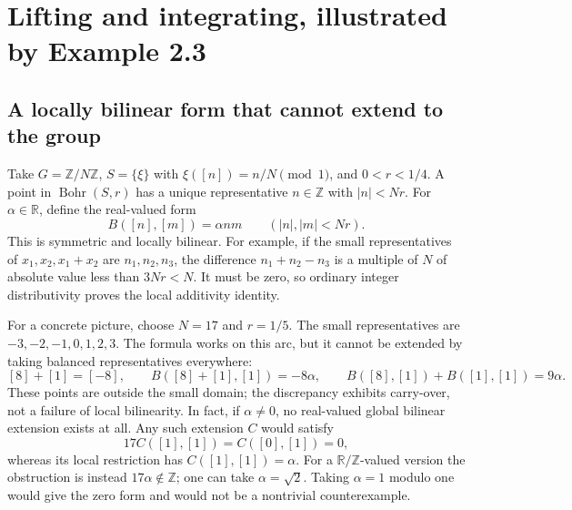\documentclass[11pt,a4paper]{article}
\newcommand{\T}{\mathbb R/\mathbb Z}
\newcommand{\Z}{\mathbb Z}
\newcommand{\R}{\mathbb R}
\newcommand{\Bohr}{\operatorname{Bohr}}
\theoremstyle{definition}
\numberwithin{equation}{section}
\begin{document}
\section{Lifting and integrating, illustrated by Example 2.3}\label{sec:algebra}
\subsection{A locally bilinear form that cannot extend to the group}
Take $G=\Z/N\Z$, $S=\{\xi\}$ with
$\xi([n])=n/N\pmod1$, and $0<r<1/4$. A point in
$\Bohr(S,r)$ has a unique representative $n\in\Z$ with $|n|<Nr$.
For $\alpha\in\R$, define the real-valued form
\begin{equation}\label{eq:example-form}
B([n],[m])=\alpha nm
\qquad(|n|,|m|<Nr).
\end{equation}
This is symmetric and locally bilinear. For example, if the small
representatives of $x_1,x_2,x_1+x_2$ are $n_1,n_2,n_3$, the difference
$n_1+n_2-n_3$ is a multiple of $N$ of absolute value less than $3Nr<N$.
It must be zero, so ordinary integer distributivity proves the local
additivity identity.

For a concrete picture, choose $N=17$ and $r=1/5$. The small
representatives are $-3,-2,-1,0,1,2,3$. The formula works on this arc,
but it cannot be extended by taking balanced representatives everywhere:
\[
[8]+[1]=[-8],\qquad
B([8]+[1],[1])=-8\alpha,
\qquad B([8],[1])+B([1],[1])=9\alpha.
\]
These points are outside the small domain; the discrepancy exhibits
carry-over, not a failure of local bilinearity. In fact, if
$\alpha\ne0$, no real-valued global bilinear extension exists at all.
Any such extension $C$ would satisfy
\[
17C([1],[1])=C([0],[1])=0,
\]
whereas its local restriction has $C([1],[1])=\alpha$. For a
$\T$-valued version the obstruction is instead $17\alpha\notin\Z$;
one can take $\alpha=\sqrt2$. Taking $\alpha=1$ modulo one would
give the zero form and would not be a nontrivial counterexample.
\end{document}
